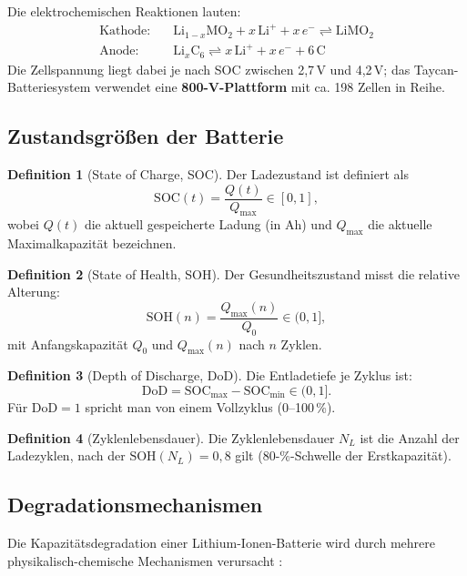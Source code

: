 ﻿\documentclass[a4paper,12pt]{article}
\theoremstyle{definition}
\newtheorem{definition}{Definition}
\begin{document}
Die elektrochemischen Reaktionen lauten:
\begin{align}
  \text{Kathode:}\quad & \mathrm{Li}_{1-x}\mathrm{MO}_2 + x\,\mathrm{Li}^+ + x\,e^- \rightleftharpoons \mathrm{LiMO}_2 \\
  \text{Anode:}\quad   & \mathrm{Li}_x\mathrm{C}_6 \rightleftharpoons x\,\mathrm{Li}^+ + x\,e^- + 6\,\mathrm{C}
\end{align}
Die Zellspannung liegt dabei je nach SOC zwischen 2,7\,V und 4,2\,V;
das Taycan-Batteriesystem verwendet eine \textbf{800-V-Plattform} mit
ca. 198 Zellen in Reihe.

\subsection{Zustandsgr\"o{\ss}en der Batterie}

\begin{definition}[State of Charge, SOC]
  Der Ladezustand ist definiert als
  \[
    \mathrm{SOC}(t) = \frac{Q(t)}{Q_{\max}} \in [0, 1],
  \]
  wobei $Q(t)$ die aktuell gespeicherte Ladung (in Ah) und $Q_{\max}$ die
  aktuelle Maximalkapazit\"at bezeichnen.
\end{definition}

\begin{definition}[State of Health, SOH]
  Der Gesundheitszustand misst die relative Alterung:
  \[
    \mathrm{SOH}(n) = \frac{Q_{\max}(n)}{Q_0} \in (0, 1],
  \]
  mit Anfangskapazit\"at $Q_0$ und $Q_{\max}(n)$ nach $n$ Zyklen.
\end{definition}

\begin{definition}[Depth of Discharge, DoD]
  Die Entladetiefe je Zyklus ist:
  \[
    \mathrm{DoD} = \mathrm{SOC}_{\max} - \mathrm{SOC}_{\min} \in (0,1].
  \]
  F\"ur $\mathrm{DoD} = 1$ spricht man von einem Vollzyklus (0--100\,\%).
\end{definition}

\begin{definition}[Zyklenlebensdauer]
  Die Zyklenlebensdauer $N_L$ ist die Anzahl der Ladezyklen, nach der
  $\mathrm{SOH}(N_L) = 0{,}8$ gilt (80-\%-Schwelle der Erstkapazit\"at).
\end{definition}

\subsection{Degradationsmechanismen}

Die Kapazit\"atsdegradation einer Lithium-Ionen-Batterie wird durch mehrere
physikalisch-chemische Mechanismen verursacht \cite{Broussely2005}:
\end{document}
